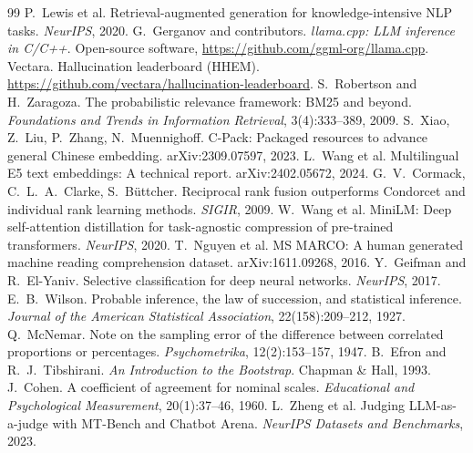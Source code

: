 \documentclass[11pt,a4paper]{article}
\begin{document}
\begin{thebibliography}{99}
 P.~Lewis et al. Retrieval-augmented generation for knowledge-intensive NLP tasks. \emph{NeurIPS}, 2020.
 G.~Gerganov and contributors. \emph{llama.cpp: LLM inference in C/C++}. Open-source software,
  \url{https://github.com/ggml-org/llama.cpp}.
 Vectara. Hallucination leaderboard (HHEM). \url{https://github.com/vectara/hallucination-leaderboard}.
 S.~Robertson and H.~Zaragoza. The probabilistic relevance framework: BM25 and beyond. \emph{Foundations
  and Trends in Information Retrieval}, 3(4):333--389, 2009.
 S.~Xiao, Z.~Liu, P.~Zhang, N.~Muennighoff. C-Pack: Packaged resources to advance general Chinese
  embedding. arXiv:2309.07597, 2023.
 L.~Wang et al. Multilingual E5 text embeddings: A technical report. arXiv:2402.05672, 2024.
 G.~V.~Cormack, C.~L.~A.~Clarke, S.~B\"uttcher. Reciprocal rank fusion outperforms Condorcet and individual
  rank learning methods. \emph{SIGIR}, 2009.
 W.~Wang et al. MiniLM: Deep self-attention distillation for task-agnostic compression of pre-trained
  transformers. \emph{NeurIPS}, 2020.
 T.~Nguyen et al. MS MARCO: A human generated machine reading comprehension dataset. arXiv:1611.09268,
  2016.
 Y.~Geifman and R.~El-Yaniv. Selective classification for deep neural networks. \emph{NeurIPS}, 2017.
 E.~B.~Wilson. Probable inference, the law of succession, and statistical inference. \emph{Journal of
  the American Statistical Association}, 22(158):209--212, 1927.
 Q.~McNemar. Note on the sampling error of the difference between correlated proportions or
  percentages. \emph{Psychometrika}, 12(2):153--157, 1947.
 B.~Efron and R.~J.~Tibshirani. \emph{An Introduction to the Bootstrap}. Chapman \& Hall, 1993.
 J.~Cohen. A coefficient of agreement for nominal scales. \emph{Educational and Psychological
  Measurement}, 20(1):37--46, 1960.
 L.~Zheng et al. Judging LLM-as-a-judge with MT-Bench and Chatbot Arena. \emph{NeurIPS Datasets and
  Benchmarks}, 2023.
\end{thebibliography}

\appendix
\end{document}
